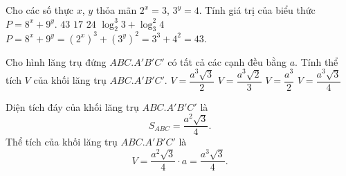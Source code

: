 \begin{ex}%
 Cho các số thực $x$, $y$ thỏa mãn $2^x = 3$, $3^y = 4$. Tính giá trị của biểu thức $P = 8^x + 9^y$.
 \choice
  {\True $43$}
  {$17$}
  {$24$}
  {$\log_2^3 3 + \log_3^2 4$}
 \loigiai
  {
  $P = 8^x + 9^y = (2^x)^3 + (3^y)^2 = 3^3 + 4^2 = 43$.
  }
\end{ex}


\begin{ex}%
 Cho hình lăng trụ đứng $ABC.A'B'C'$ có tất cả các cạnh đều bằng $a$. Tính thể tích $V$ của khối lăng trụ $ABC.A'B'C'$.
 \choice
  {$V = \dfrac{a^3 \sqrt{3}}{2}$}
  {$V = \dfrac{a^3 \sqrt{2}}{3}$}
  {$V = \dfrac{a^3}{2}$}
  {\True $V = \dfrac{a^3 \sqrt{3}}{4}$}
 \loigiai
  {
  \immini
   {
   Diện tích đáy của khối lăng trụ $ABC.A'B'C'$ là
   $$S_{ABC} = \dfrac{a^2 \sqrt{3}}{4}.$$
   Thể tích của khối lăng trụ $ABC.A'B'C'$ là
   $$V = \dfrac{a^2 \sqrt{3}}{4} \cdot a = \dfrac{a^3 \sqrt{3}}{4}.$$
   }
   {
   }
  }
\end{ex}

